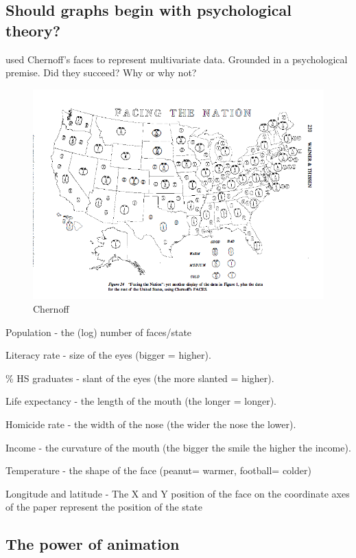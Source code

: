 \documentclass[openany]{book}
\begin{document}
\hypertarget{should-graphs-begin-with-psychological-theory}{%
\subsection{Should graphs begin with psychological theory?}\label{should-graphs-begin-with-psychological-theory}}

\citet{wainer1981graphical} used Chernoff's faces to represent multivariate data. Grounded in a psychological premise. Did they succeed? Why or why not?

\begin{figure}
\centering
\includegraphics{Chernoff.PNG}
\caption{Chernoff}
\end{figure}

Population - the (log) number of faces/state

Literacy rate - size of the eyes (bigger = higher).

\% HS graduates - slant of the eyes (the more slanted = higher).

Life expectancy - the length of the mouth (the longer = longer).

Homicide rate - the width of the nose (the wider the nose the lower).

Income - the curvature of the mouth (the bigger the smile the higher the income).

Temperature - the shape of the face (peanut= warmer, football= colder)

Longitude and latitude - The X and Y position of the face on the coordinate axes of the paper represent the position of the state

\hypertarget{the-power-of-animation}{%
\subsection{The power of animation}\label{the-power-of-animation}}
\end{document}
